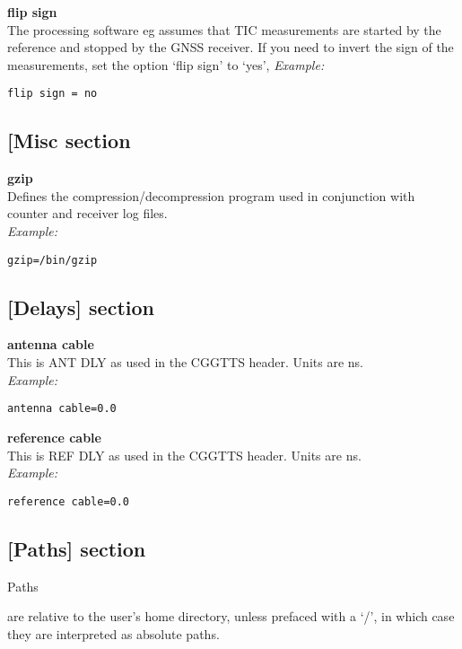{\bfseries flip sign}\\
The processing software eg  assumes that TIC measurements are started by the reference
and stopped by the GNSS receiver. If you need to invert the sign of the measurements, set the option
`flip sign' to `yes',
\textit{Example:}
\begin{lstlisting}
flip sign = no 
\end{lstlisting}

\subsection{[Misc section}

\hypertarget{h:misc}{}

{\bfseries gzip}\\
Defines the compression/decompression program used in conjunction with counter and receiver log files.\\
\textit{Example:}
\begin{lstlisting}
gzip=/bin/gzip 
\end{lstlisting}

\subsection{[Delays] section}

\hypertarget{h:delays}{}

{\bfseries antenna cable}\\
This is ANT DLY as used in the CGGTTS header. Units are ns.\\
\textit{Example:}
\begin{lstlisting}
antenna cable=0.0
\end{lstlisting}

{\bfseries reference cable}\\
This is REF DLY as used in the CGGTTS header. Units are ns.\\
\textit{Example:}
\begin{lstlisting}
reference cable=0.0
\end{lstlisting}

\subsection{[Paths] section}

\hypertarget{h:paths}{Paths} are relative to the user's home directory, unless prefaced with a `/', in which case
they are interpreted as absolute paths.

